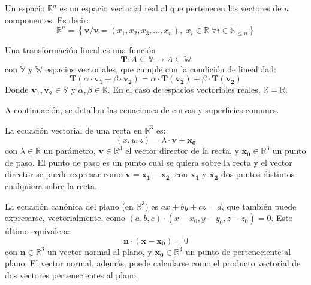 \begin{definition}
    Un espacio $\mathbb{R}^n$ es un espacio vectorial real al que pertenecen
    los vectores de $n$ componentes. Es decir:
    \begin{equation*}
        \mathbb{R}^n = \left\{ \boldsymbol{v} / \boldsymbol{v}=(x_1,x_2,x_3,...,x_n), \; x_i \in \mathbb{R} \;\forall i \in \mathbb{N}_{\leq n} \right\}
    \end{equation*}
\end{definition}
\begin{definition}
    Una transformación lineal es una función 
    \begin{equation*}
        \boldsymbol{T}:A\subseteq \mathbb{V} \rightarrow A\subseteq \mathbb{W}
    \end{equation*}
    con $\mathbb{V}$ y $\mathbb{W}$ espacios vectoriales, que cumple con la condición de linealidad:
    \begin{equation*}
        \boldsymbol{T}(\alpha \cdot \boldsymbol{v_1} + \beta \cdot \boldsymbol{v_2})=\alpha \cdot \boldsymbol{T}(\boldsymbol{v_2}) + \beta \cdot \boldsymbol{T}(\boldsymbol{v_2})
    \end{equation*}
    Donde $\boldsymbol{v_1},\boldsymbol{v_2} \in \mathbb{V}$ y $\alpha,\beta \in \mathbb{K}$. En el caso de espacios vectoriales reales,
    $\mathbb{K} = \mathbb{R}$.
\end{definition}
A continuación, se detallan las ecuaciones de curvas y superficies comunes.
\begin{definition}
    La ecuación vectorial de una recta en $\mathbb{R}^3$ es:
    \begin{equation*}
        (x,y,z) = \lambda \cdot \boldsymbol{v} + \boldsymbol{x_0}
    \end{equation*}
    con $\lambda\in\mathbb{R}$ un parámetro, $\boldsymbol{v}\in\mathbb{R}^3$ el vector director de la recta,
    y $\boldsymbol{x_0}\in\mathbb{R}^3$ un punto de paso. El punto de paso es un punto cual se quiera
    sobre la recta y el vector director se puede expresar como $\boldsymbol{v}=\boldsymbol{x_1}-\boldsymbol{x_2}$, 
    con $\boldsymbol{x_1}$ y $\boldsymbol{x_2}$ dos puntos distintos cualquiera sobre la recta.
\end{definition}
\begin{definition}
    La ecuación canónica del plano (en $\mathbb{R}^3$) es $ax+by+cz=d$, que también puede expresarse,
    vectorialmente, como $(a,b,c)\cdot(x-x_0,y-y_0,z-z_0)=0$. Esto último equivale a:
    \begin{equation*}
        \boldsymbol{n}\cdot(\boldsymbol{x} - \boldsymbol{x_0})=0
    \end{equation*}
    con $\boldsymbol{n}\in\mathbb{R}^3$ un vector normal al plano, y $\boldsymbol{x_0}\in\mathbb{R}^3$
    un punto de perteneciente al plano. El vector normal, además, puede calcularse como el producto vectorial
    de dos vectores pertenecientes al plano.
\end{definition}
